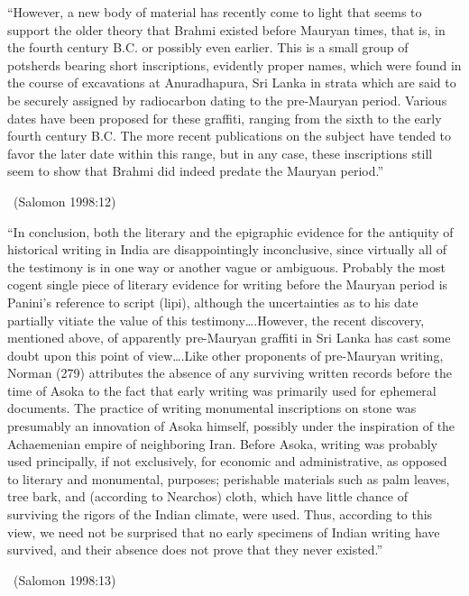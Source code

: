 \begin{myquote}
“However, a new body of material has recently come to light that seems to support the older theory that Brahmi existed before Mauryan times, that is, in the fourth century B.C. or possibly even earlier. This is a small group of potsherds bearing short inscriptions, evidently proper names, which were found in the course of excavations at Anuradhapura, Sri Lanka in strata which are said to be securely assigned by radiocarbon dating to the pre-Mauryan period. Various dates have been proposed for these graffiti, ranging from the sixth to the early fourth century B.C. The more recent publications on the subject have tended to favor the later date within this range, but in any case, these inscriptions still seem to show that Brahmi did indeed predate the Mauryan period.” 

~\hfill (Salomon 1998:12)
\end{myquote}

\begin{myquote}
“In conclusion, both the literary and the epigraphic evidence for the antiquity of historical writing in India are disappointingly inconclusive, since virtually all of the testimony is in one way or another vague or ambiguous. Probably the most cogent single piece of literary evidence for writing before the Mauryan period is Panini’s reference to script (lipi), although the uncertainties as to his date partially vitiate the value of this testimony….However, the recent discovery, mentioned above, of apparently pre-Mauryan graffiti in Sri Lanka has cast some doubt upon this point of view….Like other proponents of pre-Mauryan writing, Norman (279) attributes the absence of any surviving written records before the time of Asoka to the fact that early writing was primarily used for ephemeral documents. The practice of writing monumental inscriptions on stone was presumably an innovation of Asoka himself, possibly under the inspiration of the Achaemenian empire of neighboring Iran. Before Asoka, writing was probably used principally, if not exclusively, for economic and administrative, as opposed to literary and monumental, purposes; perishable materials such as palm leaves, tree bark, and (according to Nearchos) cloth, which have little chance of surviving the rigors of the Indian climate, were used. Thus, according to this view, we need not be surprised that no early specimens of Indian writing have survived, and their absence does not prove that they never existed.” 

\vskip -5pt

~\hfill (Salomon 1998:13)
\end{myquote}

